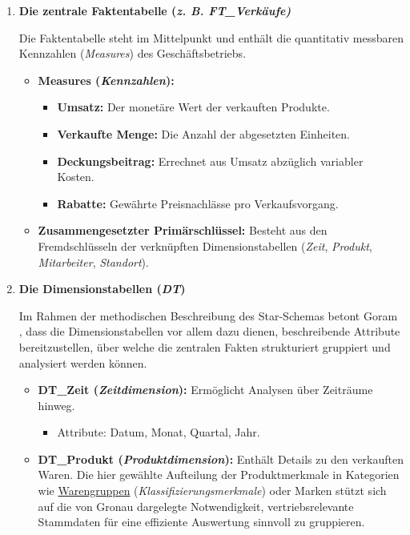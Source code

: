 \begin{enumerate}[label=\arabic*.), leftmargin=*]
    \item \textbf{Die zentrale Faktentabelle (\textit{\acs{z. B.} \acs{FT}\_Verkäufe)}} \par Die Faktentabelle steht im Mittelpunkt und enthält die quantitativ messbaren Kennzahlen (\textit{Measures}) des Geschäftsbetriebs.
    \begin{itemize}
        \item \textbf{Measures (\textit{Kennzahlen}):}
        \begin{itemize}
            \item \textbf{Umsatz:} Der monetäre Wert der verkauften Produkte.
            \item \textbf{Verkaufte Menge:} Die Anzahl der abgesetzten Einheiten.
            \item \textbf{Deckungsbeitrag:} Errechnet aus Umsatz abzüglich variabler Kosten.
            \item \textbf{Rabatte:} Gewährte Preisnachlässe pro Verkaufsvorgang.
        \end{itemize}
        \item \textbf{Zusammengesetzter Primärschlüssel:} Besteht aus den Fremdschlüsseln der verknüpften Dimensionstabellen (\textit{Zeit}, \textit{Produkt}, \textit{Mitarbeiter}, \textit{Standort}).
    \end{itemize}
    \item \textbf{Die Dimensionstabellen (\textit{\acs{DT}})} \par Im Rahmen der methodischen Beschreibung des Star-Schemas betont Goram \cite[19]{16}, dass die Dimensionstabellen vor allem dazu dienen, beschreibende Attribute bereitzustellen, über welche die zentralen Fakten strukturiert gruppiert und analysiert werden können.
    \begin{itemize}
        \item \textbf{\acs{DT}\_Zeit (\textit{Zeitdimension}):} Ermöglicht Analysen über Zeiträume hinweg.
        \begin{itemize}
            \item Attribute: Datum, Monat, Quartal, Jahr.
        \end{itemize}
        \item \textbf{\acs{DT}\_Produkt (\textit{Produktdimension}):} Enthält Details zu den verkauften Waren. Die hier gewählte Aufteilung der Produktmerkmale in Kategorien wie \uline{Warengruppen} (\textit{Klassifizierungsmerkmale}) oder Marken stützt sich auf die von Gronau \cite[99]{17} dargelegte Notwendigkeit, vertriebsrelevante Stammdaten für eine effiziente Auswertung sinnvoll zu gruppieren.

\end{itemize}
\end{enumerate}

